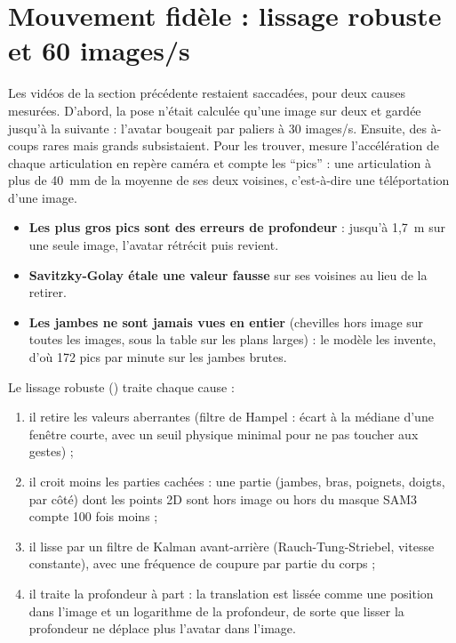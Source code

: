 \documentclass[11pt,a4paper]{report}
\newcommand{\code}[1]{\texttt{\detokenize{#1}}}
\begin{document}
\section{Mouvement fidèle : lissage robuste et 60 images/s}
\label{sec:res-motion}

Les vidéos de la section précédente restaient saccadées, pour deux causes mesurées. D'abord, la pose n'était calculée qu'une image sur
deux et gardée jusqu'à la suivante : l'avatar bougeait par paliers à 30 images/s. Ensuite, des à-coups rares mais grands subsistaient.
Pour les trouver, \code{motion_diag.py} mesure l'accélération de chaque articulation en repère caméra et compte les \enquote{pics} :
une articulation à plus de 40~mm de la moyenne de ses deux voisines, c'est-à-dire une téléportation d'une image.

\begin{itemize}
    \item \textbf{Les plus gros pics sont des erreurs de profondeur} : jusqu'à 1,7~m sur une seule image, l'avatar rétrécit puis revient.
    \item \textbf{Savitzky-Golay étale une valeur fausse} sur ses voisines au lieu de la retirer.
    \item \textbf{Les jambes ne sont jamais vues en entier} (chevilles hors image sur toutes les images, sous la table sur les plans
    larges) : le modèle les invente, d'où 172 pics par minute sur les jambes brutes.
\end{itemize}

Le lissage robuste (\code{robust_smooth.py}) traite chaque cause :
\begin{enumerate}
    \item il retire les valeurs aberrantes (filtre de Hampel : écart à la médiane d'une fenêtre courte, avec un seuil physique minimal
    pour ne pas toucher aux gestes) ;
    \item il croit moins les parties cachées : une partie (jambes, bras, poignets, doigts, par côté) dont les points 2D sont hors image
    ou hors du masque SAM3 compte 100 fois moins ;
    \item il lisse par un filtre de Kalman avant-arrière (Rauch-Tung-Striebel, vitesse constante), avec une fréquence de coupure par
    partie du corps \cite{sambody4d2025} ;
    \item il traite la profondeur à part : la translation est lissée comme une position dans l'image et un logarithme de la profondeur,
    de sorte que lisser la profondeur ne déplace plus l'avatar dans l'image.
\end{enumerate}
\end{document}
